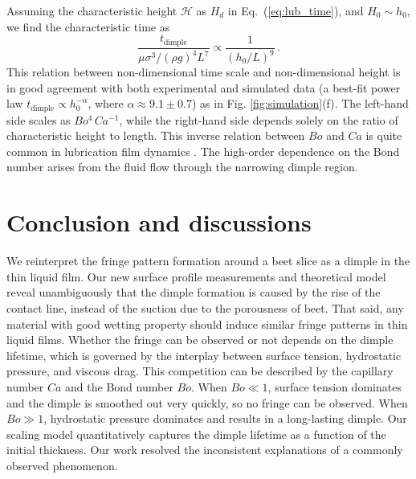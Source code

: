 \documentclass[aps,prfluids,amsmath,amssymb,superscriptaddress,longbibliography]{revtex4-2}
\newif\ifhighlight
\newcommand{\hl}[1]{\ifhighlight\textcolor{blue}{#1}\else#1\fi}
\begin{document}
\hl{Assuming the characteristic height $\mathcal{H}$ as $H_d$ in Eq.~(\ref{eq:lub_time}), and $H_0\sim h_0$, we find the characteristic time as  
\begin{equation}
    \frac{t_{\mathrm{dimple}}}{\mu \sigma^3 /(\rho g)^4 L^7} \propto \frac{1}{(h_0/L)^9} \label{eq:exponent_9} \,.
\end{equation} 
This relation between non-dimensional time scale and non-dimensional height is in good agreement with both experimental and simulated data (a best-fit power law $t_{\mathrm{dimple}}\propto h_0^{-\alpha}$, where $\alpha\approx 9.1\pm 0.7$) as in Fig. \ref{fig:simulation}(f). 
The left-hand side scales as $Bo^4 \, Ca^{-1}$, while the right-hand side depends solely on the ratio of characteristic height to length. This inverse relation between $Bo$ and $Ca$ is quite common in lubrication film dynamics \cite{pandey2023optimal}. The high-order dependence on the Bond number arises from the fluid flow through the narrowing dimple region. }

\section{Conclusion and discussions}

We reinterpret the fringe pattern formation around a beet slice as a dimple in the thin liquid film. 
Our new surface profile measurements and  theoretical model reveal unambiguously that the dimple formation is caused by the rise of the contact line, instead of the suction due to the porousness of beet.
That said, any material with good wetting property should induce similar fringe patterns in thin liquid films.
\hl{Whether the fringe can be observed or not depends on the dimple lifetime, which is governed by the interplay between surface tension, hydrostatic pressure, and viscous drag.
This competition can be described by the capillary number $Ca$ and the Bond number $Bo$.
When $Bo\ll 1$, surface tension dominates and the dimple is smoothed out very quickly, so no fringe can be observed.
When $Bo\gg 1$, hydrostatic pressure dominates and results in a long-lasting dimple. 
Our scaling model quantitatively captures the dimple lifetime as a function of the initial thickness. Our work resolved the inconsistent explanations of a commonly observed phenomenon.}
\end{document}
